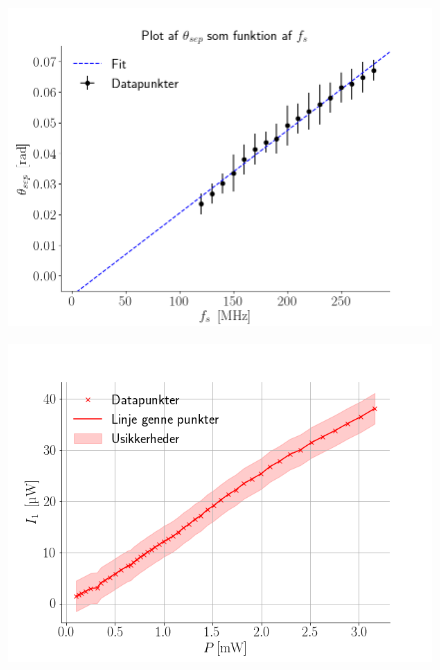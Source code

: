 \documentclass[main]{subfiles}
\begin{document}
\begin{figure}[H]
    \centering
    \includegraphics[width=\linewidth]{tegninger/graf1.png}
    \caption{}
    \label{fig:graf1}
\end{figure}
\begin{figure}[H]
    \centering
    \includegraphics[width=\linewidth]{tegninger/graf2.png}
    \caption{}
    \label{fig:graf2}
\end{figure}
\end{document}

